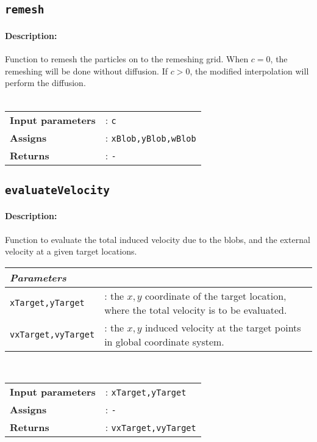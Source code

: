 \subsection{\texttt{remesh}}
	\paragraph{Description:}  Function to remesh the particles on to the remeshing grid. When $c=0$, the remeshing will be done without diffusion. If $c>0$, the modified interpolation will perform the diffusion.
	\\
	\\		
	\begin{tabular}{lp{10cm}}
		\textbf{Input parameters} &: \texttt{c}\\ 
		\textbf{Assigns} &: \texttt{xBlob,yBlob,wBlob}\\ 			
		\textbf{Returns} &: \texttt{-}\\ 					
	\end{tabular}


\subsection{\texttt{evaluateVelocity}}
	\paragraph{Description:} Function to evaluate the total induced velocity due to the blobs, and the external velocity at a given target locations.\\
	
	    \begin{tabular}{lp{10cm}}
			\textit{Parameters} & \\ \hline
			 \texttt{xTarget,yTarget} &: the $x,y$ coordinate of the target location, where the total velocity is to be evaluated.\\
			\texttt{vxTarget,vyTarget} &: the $x,y$ induced velocity at the target points in global coordinate system.\\
		\end{tabular} \vspace{5 mm}
	\\		
	\begin{tabular}{lp{10cm}}
		\textbf{Input parameters} &: \texttt{xTarget,yTarget}\\ 
		\textbf{Assigns} &: \texttt{-}\\ 			
		\textbf{Returns} &: \texttt{vxTarget,vyTarget}\\ 					
	\end{tabular}	

